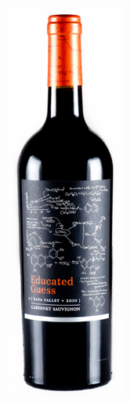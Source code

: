 \documentclass[t]{beamer}
\begin{document}
\begin{ftst}
\begin{columns}[T]
	\centering\includegraphics[width=.9\textwidth]{../figs/edguess2.jpg}

\end{columns}
\end{ftst}
\end{document}
